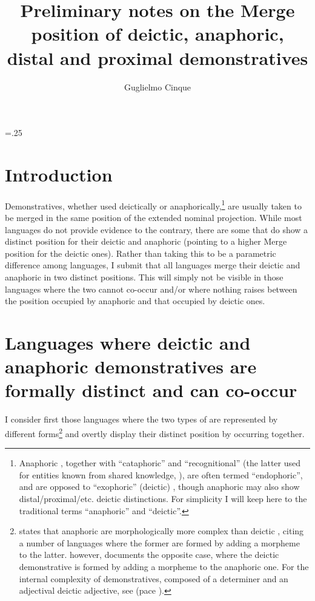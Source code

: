 \documentclass[output=paper]{langsci/langscibook}
\author{Guglielmo Cinque\affiliation{Ca' Foscari University, Venice}}
\title[Notes on the Merge position of demonstratives]
{Preliminary notes on the Merge position of deictic, anaphoric, distal
and proximal demonstratives}
\begin{document}
\maketitle\glsresetall
\multicolsep=.25\baselineskip

\section{Introduction}\largerpage

Demonstratives, whether used deictically or anaphorically,\footnote{Anaphoric
    , together with \enquote{cataphoric} and
    \enquote{recognitional}  (the latter used for entities known
    from shared knowledge, \citealt{Diessel1999}), are often termed
    \enquote{endophoric}, and are opposed to \enquote{exophoric} (deictic)
    , though anaphoric  may also show
    distal/proximal/etc. deictic distinctions. For simplicity I will keep here
    to the traditional terms \enquote{anaphoric} and \enquote{deictic}.} are
    usually taken to be merged in the same position of the extended nominal
    projection.  While most languages do not provide evidence to the contrary,
    there are some that do show a distinct  position for their deictic and
    anaphoric  (pointing to a higher Merge position for the
    deictic ones).  Rather than taking this to be a
    parametric difference among
    languages, I submit that all languages merge their deictic and anaphoric
     in two distinct positions.  This will simply not be visible
    in those languages where the two cannot co-occur and/or where nothing
    raises between the position occupied by anaphoric  and that
    occupied by deictic ones.

\section{Languages where deictic and anaphoric demonstratives are formally
distinct and can co-occur}\largerpage

I consider first those languages where the two types of  are
represented by different forms\footnote{\textcite[§5.5]{Diessel1999} states
    that anaphoric  are morphologically more complex than deictic
    , citing a number of languages where the former are formed by
    adding a morpheme to the latter. \textcite[76f]{Dixon2003} however,
    documents the opposite case, where the deictic demonstrative is formed by
    adding a morpheme to the anaphoric one. For the internal complexity of
demonstratives, composed of a determiner and an adjectival deictic adjective,
see \textcites{Leu2007}[§2.5]{Leu2015} (pace \citealt{Kleiber1986}).} and
overtly display their distinct  position by occurring together.
\end{document}
